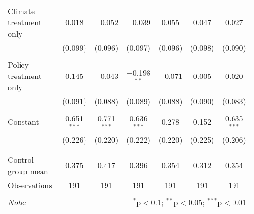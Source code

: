 \begin{tabular}{@{\extracolsep{5pt}}lcccccc}
 Climate treatment only & 0.018 & $-$0.052 & $-$0.039 & 0.055 & 0.047 & 0.027 \\ 
  & (0.099) & (0.096) & (0.097) & (0.096) & (0.098) & (0.090) \\ 
  & & & & & & \\ 
 Policy treatment only & 0.145 & $-$0.043 & $-$0.198$^{**}$ & $-$0.071 & 0.005 & 0.020 \\ 
  & (0.091) & (0.088) & (0.089) & (0.088) & (0.090) & (0.083) \\ 
  & & & & & & \\ 
 Constant & 0.651$^{***}$ & 0.771$^{***}$ & 0.636$^{***}$ & 0.278 & 0.152 & 0.635$^{***}$ \\ 
  & (0.226) & (0.220) & (0.222) & (0.220) & (0.225) & (0.206) \\ 
  & & & & & & \\ 
\hline \\[-1.8ex] 
Control group mean & 0.375 & 0.417 & 0.396 & 0.354 & 0.312 & 0.354 \\ 
Observations & 191 & 191 & 191 & 191 & 191 & 191 \\ 
\hline 
\hline \\[-1.8ex] 
\textit{Note:}  & \multicolumn{6}{r}{$^{*}$p$<$0.1; $^{**}$p$<$0.05; $^{***}$p$<$0.01} \\ 
\end{tabular} 
